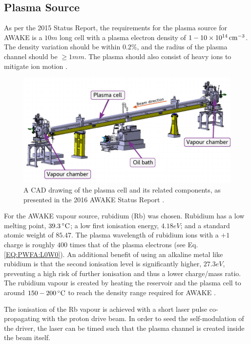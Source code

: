 \subsection{Plasma Source}
\label{WFA:Design:Plasma}

As per the 2015 Status Report, the requirements for the plasma source for AWAKE is a $10\unit{m}$ long cell with a plasma electron density of $1-10\nexp{14}\unit{cm}^{-3}$. The density variation should be within $0.2\%$, and the radius of the plasma channel should be $\geq 1\unit{mm}$. The plasma should also consist of heavy ions to mitigate ion motion \cite{caldwell:2015}.

\begin{figure}[hbt]
    \centering
    \includegraphics[width=0.99\linewidth,trim={0mm 0mm 0mm 0mm},clip]{figures/PlasmaCell}
    \caption{\label{Fig:WFA:PlasmaCell} A CAD drawing of the plasma cell and its related components, as presented in the 2016 AWAKE Status Report \cite{awake_collaboration:2016}.}
\end{figure}

For the AWAKE vapour source, rubidium (Rb) was chosen. Rubidium has a low melting point, $39.3\celsius$; a low first ionisation energy, $4.18\unit{eV}$; and a standard atomic weight of $85.47$. The plasma wavelength of rubidium ions with a $+1$ charge is roughly $400$ times that of the plasma electrons (see Eq. \ref{EQ:PWFA:L0W0}). An additional benefit of using an alkaline metal like rubidium is that the second ionisation level is significantly higher, $27.3\unit{eV}$, preventing a high risk of further ionisation and thus a lower charge/mass ratio. The rubidium vapour is created by heating the reservoir and the plasma cell to around $150-200\celsius$ to reach the density range required for AWAKE \cite{caldwell:2015}.

The ionisation of the Rb vapour is achieved with a short laser pulse co-propagating with the proton drive beam. In order to seed the self-modulation of the driver, the laser can be timed such that the plasma channel is created inside the beam itself.

